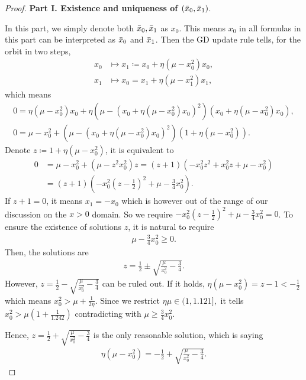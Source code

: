 \documentclass{article}
\theoremstyle{plain}
\theoremstyle{remark}
\begin{document}
\begin{proof}

\textbf{Part I. Existence and uniqueness of $(\Bar{x}_0, \Bar{x}_1)$}.

In this part, we simply denote both $\Bar{x}_0, \Bar{x}_1$ as $x_0$. This means $x_0$ in all formulas in this part can be interpreted as $\Bar{x}_0$ and $\Bar{x}_1$. Then the GD update rule tells, for the orbit in two steps,
\begin{align*}
    x_0
    &\mapsto
    x_1 \coloneqq
    x_0+\eta(\mu-x_0^2) x_0,\\
    x_1
    &\mapsto
    x_0=
    x_1+\eta(\mu-x_1^2) x_1,
\end{align*}
which means
\begin{align*}
    0=\eta(\mu-x_0^2)x_0+\eta\left(\mu-\left(x_0+\eta(\mu-x_0^2)x_0\right)^2\right)\left(x_0+\eta(\mu-x_0^2)x_0\right),\\
    0=\mu-x_0^2+\left(\mu-\left(x_0+\eta(\mu-x_0^2)x_0\right)^2\right)\left(1+\eta(\mu-x_0^2)\right).
\end{align*}
Denote $z\coloneqq 1+\eta(\mu-x_0^2)$, it is equivalent to
\begin{align*}
    0 &= \mu-x_0^2+(\mu-z^2 x_0^2)z=(z+1)(-x_0^2 z^2+x_0^2z+\mu-x_0^2)\\
    &= (z+1)\left(-x_0^2(z-\frac{1}{2})^2+\mu-\frac{3}{4}x_0^2 \right).
\end{align*}
If $z+1=0$, it means $x_1 = -x_0$ which is however out of the range of our discussion on the $x>0$ domain. So we require $-x_0^2(z-\frac{1}{2})^2+\mu-\frac{3}{4}x_0^2=0$. To ensure the existence of solutions $z$, it is natural to require
\begin{align*}
    \mu-\frac{3}{4}x_0^2 \ge 0.
\end{align*}
Then, the solutions are
\begin{align*}
    z=\frac{1}{2}\pm\sqrt{\frac{\mu}{x_0^2}-\frac{3}{4}}.
\end{align*}
However, $z=\frac{1}{2}-\sqrt{\frac{\mu}{x_0^2}-\frac{3}{4}}$ can be ruled out. If it holds, $\eta(\mu-x_0^2)=z-1<-\frac{1}{2}$ which means $x_0^2>\mu+\frac{1}{2\eta}$. Since we restrict $\eta\mu\in(1,1.121],$ it tells $x_0^2>\mu(1+\frac{1}{1.242})$ contradicting with $\mu\ge\frac{3}{4}x_0^2$.

Hence, $z=\frac{1}{2}+\sqrt{\frac{\mu}{x_0^2}-\frac{3}{4}}$ is the only reasonable solution, which is saying
\begin{align*}
    \eta(\mu-x_0^2)=-\frac{1}{2}+\sqrt{\frac{\mu}{x_0^2}-\frac{3}{4}}.
\end{align*}


\end{proof}
\end{document}
